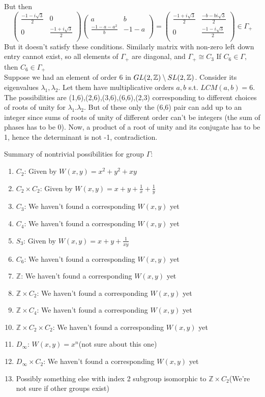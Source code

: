 \documentclass[a4paper]{article}
\begin{document}
But then 
$$\begin{pmatrix}
\frac{-1-i\sqrt{3}}{2} & 0 \\ 
0 &  \frac{-1+i\sqrt{3}}{2}\\
\end{pmatrix} \begin{pmatrix}
a & b \\ 
\frac{-1-a-a^2}{b} & -1-a \\
\end{pmatrix} = \begin{pmatrix}
\frac{-1+i\sqrt{3}}{2} & \frac{-b-b i\sqrt{3}}{2} \\ 
0 & \frac{-1-i\sqrt{3}}{2} \\
\end{pmatrix} \in \Gamma_+$$
But it doesn't satisfy these conditions.
Similarly matrix with non-zero left down entry cannot exist, so all elements of $\Gamma_+$ are diagonal, and $\Gamma_+ \cong C_3$
\clm If $C_6 \in \Gamma$, then $C_6\in \Gamma_+$\\

Suppose we had an element of order 6 in $GL(2,\mathbb{Z})\setminus SL(2,\mathbb{Z})$. Consider its eigenvalues $\lambda_1,\lambda_2$. Let them have multiplicative orders $a,b$ s.t. $LCM(a,b)=6$. The possibilities are (1,6),(2,6),(3,6),(6,6),(2,3) corresponding to different choices of roots of unity for  $\lambda_1.\lambda_2$. But of these only the (6,6) pair can add up to an integer since sums of roots of unity of different order can't be integers (the sum of phases has to be 0). Now, a product of a root of unity and its conjugate has to be 1, hence the determinant is not -1, contradiction.
 
Summary of nontrivial possibilities for group $\Gamma$:
\begin{enumerate}
	\item $C_2$: Given by $W(x,y) = x^2 + y^2+ x y$ 
	\item $C_2 \times C_2$: Given by $W(x,y) = x+ y +\frac{1}{x}+\frac{1}{y}$
	\item $C_3$: We haven't found a corresponding $W(x,y)$ yet
	\item $C_4$: We haven't found a corresponding $W(x,y)$ yet
	\item $S_3$: Given by $W(x,y) = x + y +\frac{1}{xy}$
	\item $C_6$: We haven't found a corresponding $W(x,y)$ yet
	\item $\mathbb{Z}$: We haven't found a corresponding $W(x,y)$ yet
	\item $\mathbb{Z} \times C_2$: We haven't found a corresponding $W(x,y)$ yet
	\item $\mathbb{Z} \times C_4$: We haven't found a corresponding $W(x,y)$ yet
	\item $\mathbb{Z} \times C_2 \times C_2$: We haven't found a corresponding $W(x,y)$ yet
	\item $D_\infty$: $W(x,y) = x^n$(not sure about this one)
	\item $D_\infty \times C_2$: We haven't found a corresponding $W(x,y)$ yet
	\item Possibly something else with index 2 subgroup isomorphic to $\mathbb{Z} \times C_2$(We're not sure if other groups exist)
\end{enumerate}
\end{document}
